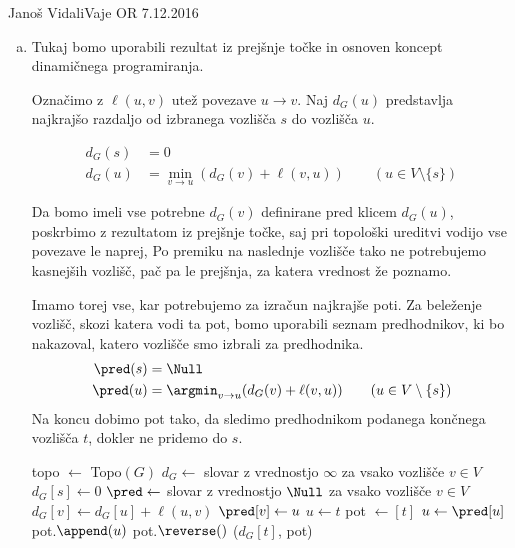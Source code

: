 \begin{naloga}{Janoš Vidali}{Vaje OR 7.12.2016}
\begin{odgovor}
\begin{enumerate}[(a)]
Klic {\sc Topo}$(G)$ nam vrne ureditev vozlišč $[g, a, h, b, c, f, d, e]$.

\item Tukaj bomo uporabili rezultat iz prejšnje točke
in osnoven koncept dinamičnega programiranja.

Označimo z $\ell(u, v)$ utež povezave $u \rightarrow v$.
Naj $d_G(u)$ predstavlja najkrajšo razdaljo
od izbranega vozlišča $s$ do vozlišča $u$.

\begin{align*}
d_G(s) &= 0 \\
d_G(u) &= \min_{v \rightarrow u}(d_G(v) + \ell(v, u))
\qquad (u \in V \setminus \{s\})
\end{align*}

Da bomo imeli vse potrebne $d_G(v)$ definirane pred klicem $d_G(u)$,
poskrbimo z rezultatom iz prejšnje točke,
saj pri topološki ureditvi vodijo vse povezave le naprej,
Po premiku na naslednje vozlišče tako ne potrebujemo kasnejših vozlišč,
pač pa le prejšnja, za katera vrednost že poznamo.

Imamo torej vse, kar potrebujemo za izračun najkrajše poti.
Za beleženje vozlišč, skozi katera vodi ta pot,
bomo uporabili seznam predhodnikov,
ki bo nakazoval, katero vozlišče smo izbrali za predhodnika.
\begin{align*}
\pred(s) &= \Null \\
\pred(u) &= \argmin_{v \rightarrow u}(d_G(v) + \ell(v, u))
\qquad (u \in V \setminus \{s\})
\end{align*}
Na koncu dobimo pot tako,
da sledimo predhodnikom podanega končnega vozlišča $t$,
dokler ne pridemo do $s$.

\begin{small}
\begin{algorithmic}
	\State topo $\gets$ {\sc Topo}$(G)$
	\State $d_G \gets$ slovar z vrednostjo $\infty$ za vsako vozlišče $v \in V$
	\State $d_G[s] \gets 0$
	\State $\pred \gets$ slovar z vrednostjo $\Null$ za vsako vozlišče $v \in V$
				\State $d_G[v] \gets d_G[u] + \ell(u, v)$
				\State $\pred[v] \gets u$
			\EndIf
		\EndFor
	\EndFor
    \State $u \gets t$
	\State pot $\gets [t]$
	\While{$\pred[u] \ne \Null$}
        \State $u \gets \pred[u]$
		\State pot.$\append(u)$
	\EndWhile
    \State pot.$\reverse()$
	\State \Return ($d_G[t]$, pot)
\EndFunction 
\end{algorithmic}
\end{small}


\end{enumerate}
\end{odgovor}
\end{naloga}
